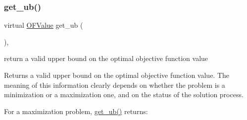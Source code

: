 \mbox{\label{class_s_m_spp__di__unipi__it_1_1_solver_a7304d819b2eeff3d4ba650055b24e3a5}} 
\subsubsection{\texorpdfstring{get\+\_\+ub()}{get\_ub()}}
{\footnotesize\ttfamily virtual \mbox{\hyperlink{class_s_m_spp__di__unipi__it_1_1_solver_ab8ce6bff9c21fdcd41e355167209301a}{O\+F\+Value}} get\+\_\+ub (\begin{DoxyParamCaption}\item[{void}]{ }\end{DoxyParamCaption})\hspace{0.3cm}{\ttfamily [inline]}, {\ttfamily [virtual]}}



return a valid upper bound on the optimal objective function value 

Returns a valid upper bound on the optimal objective function value. The meaning of this information clearly depends on whether the problem is a minimization or a maximization one, and on the status of the solution process.

For a maximization problem, \mbox{\hyperlink{class_s_m_spp__di__unipi__it_1_1_solver_a7304d819b2eeff3d4ba650055b24e3a5}{get\+\_\+ub()}} returns\+:


